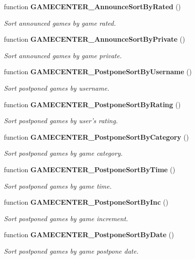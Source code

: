 \begin{CompactItemize}
function {\bf GAMECENTER\_\-AnnounceSortByRated} ()
\begin{CompactList}\small\item\em Sort announced games by game rated. \item\end{CompactList}\item 
function {\bf GAMECENTER\_\-AnnounceSortByPrivate} ()
\begin{CompactList}\small\item\em Sort announced games by game private. \item\end{CompactList}\item 
function {\bf GAMECENTER\_\-PostponeSortByUsername} ()
\begin{CompactList}\small\item\em Sort postponed games by username. \item\end{CompactList}\item 
function {\bf GAMECENTER\_\-PostponeSortByRating} ()
\begin{CompactList}\small\item\em Sort postponed games by user's rating. \item\end{CompactList}\item 
function {\bf GAMECENTER\_\-PostponeSortByCategory} ()
\begin{CompactList}\small\item\em Sort postponed games by game category. \item\end{CompactList}\item 
function {\bf GAMECENTER\_\-PostponeSortByTime} ()
\begin{CompactList}\small\item\em Sort postponed games by game time. \item\end{CompactList}\item 
function {\bf GAMECENTER\_\-PostponeSortByInc} ()
\begin{CompactList}\small\item\em Sort postponed games by game increment. \item\end{CompactList}\item 
function {\bf GAMECENTER\_\-PostponeSortByDate} ()
\begin{CompactList}\small\item\em Sort postponed games by game postpone date. \item\end{CompactList}\item 

\end{CompactItemize}
